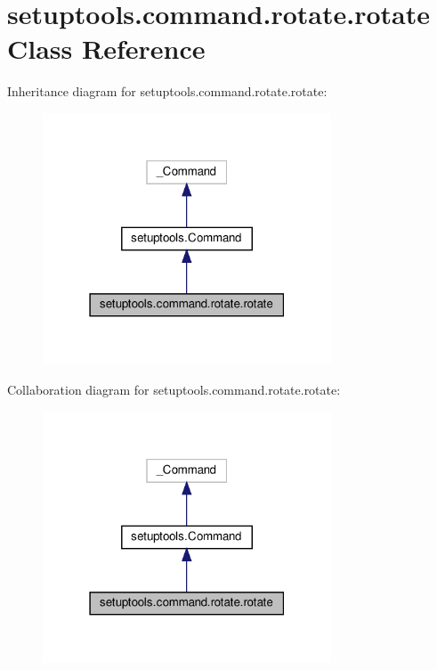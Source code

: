 \hypertarget{classsetuptools_1_1command_1_1rotate_1_1rotate}{}\section{setuptools.\+command.\+rotate.\+rotate Class Reference}
\label{classsetuptools_1_1command_1_1rotate_1_1rotate}


Inheritance diagram for setuptools.\+command.\+rotate.\+rotate\+:
\nopagebreak
\begin{figure}[H]
\begin{center}
\leavevmode
\includegraphics[width=243pt]{classsetuptools_1_1command_1_1rotate_1_1rotate__inherit__graph}
\end{center}
\end{figure}


Collaboration diagram for setuptools.\+command.\+rotate.\+rotate\+:
\nopagebreak
\begin{figure}[H]
\begin{center}
\leavevmode
\includegraphics[width=243pt]{classsetuptools_1_1command_1_1rotate_1_1rotate__coll__graph}
\end{center}
\end{figure}
